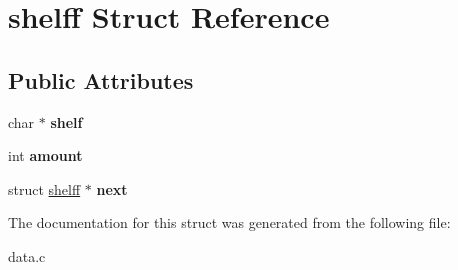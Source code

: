 \hypertarget{structshelff}{\section{shelff Struct Reference}
\label{structshelff}
}
\subsection*{Public Attributes}
\begin{DoxyCompactItemize}
\item 
\hypertarget{structshelff_a3ce85133c4a5b17c2446b1d4f04b71e2}{char $\ast$ {\bfseries shelf}}\label{structshelff_a3ce85133c4a5b17c2446b1d4f04b71e2}

\item 
\hypertarget{structshelff_aece17786125a27f94828feedb16e637e}{int {\bfseries amount}}\label{structshelff_aece17786125a27f94828feedb16e637e}

\item 
\hypertarget{structshelff_aadd19f5655002df901728551cd4edea2}{struct \hyperlink{structshelff}{shelff} $\ast$ {\bfseries next}}\label{structshelff_aadd19f5655002df901728551cd4edea2}

\end{DoxyCompactItemize}


The documentation for this struct was generated from the following file\-:\begin{DoxyCompactItemize}
\item 
data.\-c\end{DoxyCompactItemize}
